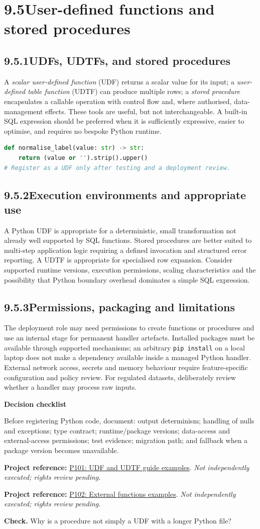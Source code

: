 \documentclass[11pt,twoside]{article}
\newcommand{\topic}[2]{\subsection*{#1\quad #2}}
\newcommand{\repo}[2]{\par\begingroup\fontsize{8.0}{9.6}\selectfont\sffamily\color{inkgray}\textbf{Project reference:} \href{#2}{#1}. \textit{Not independently executed; rights review pending.}\par\endgroup}
\begin{document}
\section*{9.5\quad User-defined functions and stored procedures}
\topic{9.5.1}{UDFs, UDTFs, and stored procedures}
A \emph{scalar user-defined function} (UDF) returns a scalar value for its input; a \emph{user-defined table function} (UDTF) can produce multiple rows; a \emph{stored procedure} encapsulates a callable operation with control flow and, where authorised, data-management effects. These tools are useful, but not interchangeable. A built-in SQL expression should be preferred when it is sufficiently expressive, easier to optimise, and requires no bespoke Python runtime.
\begin{lstlisting}[language=Python,caption={Pure handler idea; deployment and account rights not demonstrated.}]
def normalise_label(value: str) -> str:
    return (value or '').strip().upper()
# Register as a UDF only after testing and a deployment review.
\end{lstlisting}
\topic{9.5.2}{Execution environments and appropriate use}
A Python UDF is appropriate for a deterministic, small transformation not already well supported by SQL functions. Stored procedures are better suited to multi-step application logic requiring a defined invocation and structured error reporting. A UDTF is appropriate for specialised row expansion. Consider supported runtime versions, execution permissions, scaling characteristics and the possibility that Python boundary overhead dominates a simple SQL expression.
\topic{9.5.3}{Permissions, packaging and limitations}
The deployment role may need permissions to create functions or procedures and use an internal stage for permanent handler artefacts. Installed packages must be available through supported mechanisms; an arbitrary \texttt{pip install} on a local laptop does not make a dependency available inside a managed Python handler. External network access, secrets and memory behaviour require feature-specific configuration and policy review. For regulated datasets, deliberately review whether a handler may process raw inputs.
\begin{whitebox}\textbf{Decision checklist}\par
Before registering Python code, document: output determinism; handling of nulls and exceptions; type contract; runtime/package versions; data-access and external-access permissions; test evidence; migration path; and fallback when a package version becomes unavailable.\end{whitebox}
\repo{P101: UDF and UDTF guide examples}{https://github.com/Snowflake-Labs/sfguide-UDF-UDTF-examples}
\repo{P102: External functions examples}{https://github.com/Snowflake-Labs/sfguide-external-functions-examples}
\textbf{Check.} Why is a procedure not simply a UDF with a longer Python file?
\newpage
\end{document}
